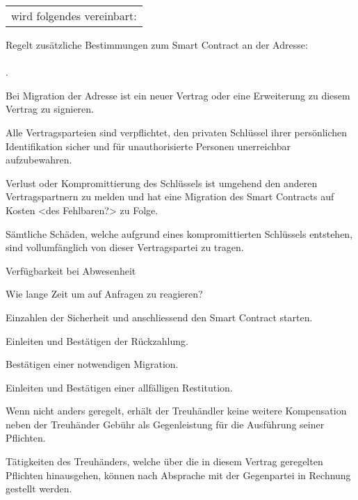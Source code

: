 \documentclass[parskip=half]{scrreprt}
\begin{document}
\vspace{0,5 cm} 
 \begin{tabular}[t]{l@{}}%
 wird folgendes vereinbart: 
 \end{tabular}%
\begin{contract} 

  
Regelt zusätzliche Bestimmungen zum Smart Contract an der Adresse: \\
\smallskip \hfill \\
.\dotfill 

Bei Migration der Adresse ist ein neuer Vertrag oder eine Erweiterung zu diesem Vertrag zu signieren.


Alle Vertragsparteien sind verpflichtet, den privaten Schlüssel ihrer persönlichen Identifikation sicher und für unauthorisierte Personen unerreichbar aufzubewahren.

Verlust oder Kompromittierung des Schlüssels ist umgehend den anderen Vertragspartnern zu melden und hat eine Migration des Smart Contracts auf Kosten <des Fehlbaren?> zu Folge.

Sämtliche Schäden, welche aufgrund eines kompromittierten Schlüssels entstehen, sind vollumfänglich von dieser Vertragspartei zu tragen.


Verfügbarkeit bei Abwesenheit

Wie lange Zeit um auf Anfragen zu reagieren?



Einzahlen der Sicherheit und anschliessend den Smart Contract starten.

Einleiten und Bestätigen der Rückzahlung.

Bestätigen einer notwendigen Migration.


Einleiten und Bestätigen einer allfälligen Restitution.


Wenn nicht anders geregelt, erhält der Treuhändler keine weitere Kompensation neben der Treuhänder Gebühr als Gegenleistung für die Ausführung seiner Pflichten.

Tätigkeiten des Treuhänders, welche über die in diesem Vertrag geregelten Pflichten hinausgehen, können nach Absprache mit der Gegenpartei in Rechnung gestellt werden.


\end{contract}
\end{document}
